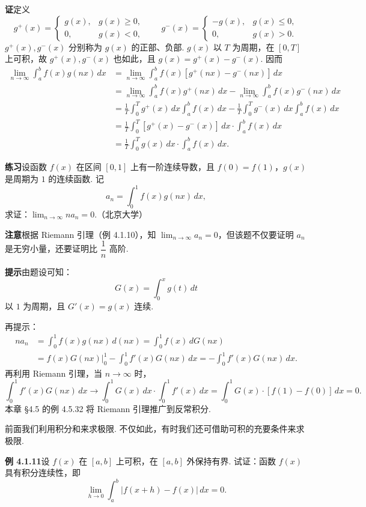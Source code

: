 \documentclass[UTF8, 12pt, fontset=fandol, oneside]{ctexart}
\begin{document}
\noindent\textbf{证}\quad 定义
\[
g^+(x)=
\begin{cases}
g(x),& g(x)\ge0,\\
0,& g(x)<0,
\end{cases}
\qquad
g^-(x)=
\begin{cases}
-g(x),& g(x)\le0,\\
0,& g(x)>0.
\end{cases}
\]
$g^+(x),g^-(x)$ 分别称为 $g(x)$ 的正部、负部. $g(x)$ 以 $T$ 为周期，在 $[0,T]$ 上可积，故 $g^+(x),g^-(x)$ 也如此，且 $g(x)=g^+(x)-g^-(x)$. 因而
\[
\begin{aligned}
\lim_{n\to\infty}\int_a^b f(x)g(nx)\,dx
&=\lim_{n\to\infty}\int_a^b f(x)[g^+(nx)-g^-(nx)]\,dx\\
&=\lim_{n\to\infty}\int_a^b f(x)g^+(nx)\,dx
-\lim_{n\to\infty}\int_a^b f(x)g^-(nx)\,dx\\
&=\frac1T\int_0^T g^+(x)\,dx\int_a^b f(x)\,dx
-\frac1T\int_0^T g^-(x)\,dx\int_a^b f(x)\,dx\\
&=\frac1T\int_0^T[g^+(x)-g^-(x)]\,dx\cdot\int_a^b f(x)\,dx\\
&=\frac1T\int_0^T g(x)\,dx\cdot\int_a^b f(x)\,dx.
\end{aligned}
\]

\noindent\textbf{练习}\quad 设函数 $f(x)$ 在区间 $[0,1]$ 上有一阶连续导数，且 $f(0)=f(1)$，$g(x)$ 是周期为 $1$ 的连续函数. 记
\[
a_n=\int_0^1 f(x)g(nx)\,dx,
\]
求证：$\displaystyle\lim_{n\to\infty}na_n=0$.（北京大学）

\noindent\textbf{注意}\quad 根据 Riemann 引理（例 4.1.10），知 $\displaystyle\lim_{n\to\infty}a_n=0$，但该题不仅要证明 $a_n$ 是无穷小量，还要证明比 $\dfrac1n$ 高阶.

\noindent\textbf{提示}\quad 由题设可知：
\[
G(x)=\int_0^x g(t)\,dt
\]
以 $1$ 为周期，且 $G'(x)=g(x)$ 连续.

再提示：
\[
\begin{aligned}
na_n
&=\int_0^1 f(x)g(nx)\,d(nx)
=\int_0^1 f(x)\,dG(nx)\\
&=f(x)G(nx)\bigg|_0^1-\int_0^1 f'(x)G(nx)\,dx
=-\int_0^1 f'(x)G(nx)\,dx.
\end{aligned}
\]
再利用 Riemann 引理，当 $n\to\infty$ 时，
\[
\int_0^1 f'(x)G(nx)\,dx
\to \int_0^1G(x)\,dx\cdot\int_0^1f'(x)\,dx
=\int_0^1G(x)\cdot[f(1)-f(0)]\,dx=0.
\]
本章 §4.5 的例 4.5.32 将 Riemann 引理推广到反常积分.

前面我们利用积分和来求极限. 不仅如此，有时我们还可借助可积的充要条件来求极限.

\noindent\textbf{例 4.1.11}\quad 设 $f(x)$ 在 $[a,b]$ 上可积，在 $[a,b]$ 外保持有界. 试证：函数 $f(x)$ 具有积分连续性，即
\[
\lim_{h\to0}\int_a^b|f(x+h)-f(x)|\,dx=0.
\]
\end{document}
